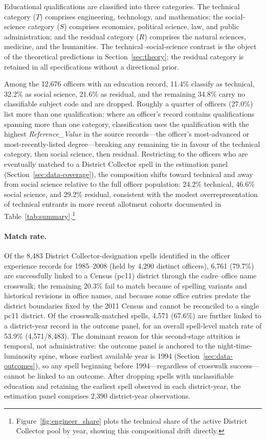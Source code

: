 Educational qualifications are classified into three categories. The technical
category ($T$) comprises engineering, technology, and mathematics; the
social-science category ($S$) comprises economics, political science, law, and
public administration; and the residual category ($R$) comprises the natural
sciences, medicine, and the humanities. The technical--social-science contrast is
the object of the theoretical predictions in Section~\ref{sec:theory}; the residual
category is retained in all specifications without a directional prior.

Among the 12,676 officers with an education record, 11.4\% classify as technical,
32.2\% as social science, 21.6\% as residual, and the remaining 34.8\% carry no
classifiable subject code and are dropped. Roughly a quarter of officers (27.0\%)
list more than one qualification; where an officer's record contains qualifications
spanning more than one category, classification uses the qualification with the
highest \textit{Reference\_Value} in the source records---the officer's
most-advanced or most-recently-listed degree---breaking any remaining tie in favour
of the technical category, then social science, then residual. Restricting to the
officers who are eventually matched to a District Collector spell in the estimation
panel (Section~\ref{sec:data-coverage}), the composition shifts toward technical and
away from social science relative to the full officer population: 24.2\% technical,
46.6\% social science, and 29.2\% residual, consistent with the modest overrepresentation
of technical entrants in more recent allotment cohorts documented in
Table~\ref{tab:summary}.\footnote{Figure~\ref{fig:engineer_share} plots the technical
share of the active District Collector pool by year, showing this compositional
drift directly.}

\paragraph{Match rate.} Of the 8,483 District Collector-designation spells
identified in the officer experience records for 1985--2008 (held by 4,290 distinct
officers), 6,761 (79.7\%) are successfully linked to a Census (pc11) district
through the cadre--office name crosswalk; the remaining 20.3\% fail to match because
of spelling variants and historical revisions in office names, and because some
office entries predate the district boundaries fixed by the 2011 Census and cannot
be reconciled to a single pc11 district. Of the crosswalk-matched spells, 4,571
(67.6\%) are further linked to a district-year record in the outcome panel, for an
overall spell-level match rate of 53.9\% (4,571/8,483). The dominant reason for this
second-stage attrition is temporal, not administrative: the outcome panel is
anchored to the night-time-luminosity spine, whose earliest available year is 1994
(Section~\ref{sec:data-outcomes}), so any spell beginning before 1994---regardless of
crosswalk success---cannot be linked to an outcome. After dropping spells with
unclassifiable education and retaining the earliest spell observed in each
district-year, the estimation panel comprises 2,390 district-year observations.

